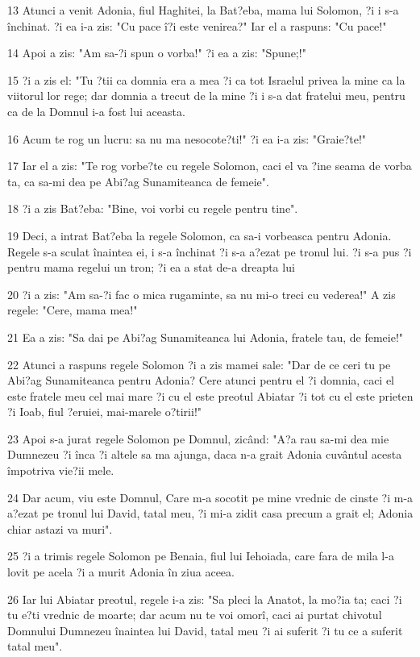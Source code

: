\par 13 Atunci a venit Adonia, fiul Haghitei, la Bat?eba, mama lui Solomon, ?i i s-a închinat. ?i ea i-a zis: "Cu pace î?i este venirea?" Iar el a raspuns: "Cu pace!"
\par 14 Apoi a zis: "Am sa-?i spun o vorba!" ?i ea a zis: "Spune;!"
\par 15 ?i a zis el: "Tu ?tii ca domnia era a mea ?i ca tot Israelul privea la mine ca la viitorul lor rege; dar domnia a trecut de la mine ?i i s-a dat fratelui meu, pentru ca de la Domnul i-a fost lui aceasta.
\par 16 Acum te rog un lucru: sa nu ma nesocote?ti!" ?i ea i-a zis: "Graie?te!"
\par 17 Iar el a zis: "Te rog vorbe?te cu regele Solomon, caci el va ?ine seama de vorba ta, ca sa-mi dea pe Abi?ag Sunamiteanca de femeie".
\par 18 ?i a zis Bat?eba: "Bine, voi vorbi cu regele pentru tine".
\par 19 Deci, a intrat Bat?eba la regele Solomon, ca sa-i vorbeasca pentru Adonia. Regele s-a sculat înaintea ei, i s-a închinat ?i s-a a?ezat pe tronul lui. ?i s-a pus ?i pentru mama regelui un tron; ?i ea a stat de-a dreapta lui
\par 20 ?i a zis: "Am sa-?i fac o mica rugaminte, sa nu mi-o treci cu vederea!" A zis regele: "Cere, mama mea!"
\par 21 Ea a zis: "Sa dai pe Abi?ag Sunamiteanca lui Adonia, fratele tau, de femeie!"
\par 22 Atunci a raspuns regele Solomon ?i a zis mamei sale: "Dar de ce ceri tu pe Abi?ag Sunamiteanca pentru Adonia? Cere atunci pentru el ?i domnia, caci el este fratele meu cel mai mare ?i cu el este preotul Abiatar ?i tot cu el este prieten ?i Ioab, fiul ?eruiei, mai-marele o?tirii!"
\par 23 Apoi s-a jurat regele Solomon pe Domnul, zicând: "A?a rau sa-mi dea mie Dumnezeu ?i înca ?i altele sa ma ajunga, daca n-a grait Adonia cuvântul acesta împotriva vie?ii mele.
\par 24 Dar acum, viu este Domnul, Care m-a socotit pe mine vrednic de cinste ?i m-a a?ezat pe tronul lui David, tatal meu, ?i mi-a zidit casa precum a grait el; Adonia chiar astazi va muri".
\par 25 ?i a trimis regele Solomon pe Benaia, fiul lui Iehoiada, care fara de mila l-a lovit pe acela ?i a murit Adonia în ziua aceea.
\par 26 Iar lui Abiatar preotul, regele i-a zis: "Sa pleci la Anatot, la mo?ia ta; caci ?i tu e?ti vrednic de moarte; dar acum nu te voi omorî, caci ai purtat chivotul Domnului Dumnezeu înaintea lui David, tatal meu ?i ai suferit ?i tu ce a suferit tatal meu".
